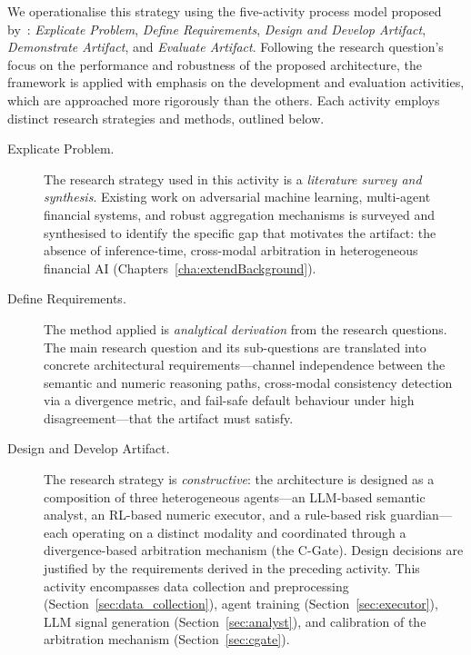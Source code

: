 We operationalise this strategy using the five-activity process model proposed
by~\cite{johannesson2014design}: \textit{Explicate Problem}, \textit{Define
Requirements}, \textit{Design and Develop Artifact}, \textit{Demonstrate
Artifact}, and \textit{Evaluate Artifact}. Following the research question's
focus on the performance and robustness of the proposed architecture, the
framework is applied with emphasis on the development and evaluation activities,
which are approached more rigorously than the others. Each activity employs
distinct research strategies and methods, outlined below.

\begin{description}
    \item[Explicate Problem.] The research strategy used in this activity is a
    \textit{literature survey and synthesis}. Existing work on adversarial
    machine learning, multi-agent financial systems, and robust aggregation
    mechanisms is surveyed and synthesised to identify the specific gap that
    motivates the artifact: the absence of inference-time, cross-modal
    arbitration in heterogeneous financial AI
    (Chapters~\ref{cha:extendBackground}).

    \item[Define Requirements.] The method applied is \textit{analytical
    derivation} from the research questions. The main research question and its
    sub-questions are translated into concrete architectural requirements---channel
    independence between the semantic and numeric reasoning paths, cross-modal
    consistency detection via a divergence metric, and fail-safe default
    behaviour under high disagreement---that the artifact must satisfy.

    \item[Design and Develop Artifact.] The research strategy is
    \textit{constructive}: the architecture is designed as a composition of three
    heterogeneous agents---an LLM-based semantic analyst, an RL-based numeric
    executor, and a rule-based risk guardian---each operating on a distinct
    modality and coordinated through a divergence-based arbitration mechanism
    (the C-Gate). Design decisions are justified by the requirements
    derived in the preceding activity. This activity encompasses data collection
    and preprocessing (Section~\ref{sec:data_collection}), agent training
    (Section~\ref{sec:executor}), LLM signal generation
    (Section~\ref{sec:analyst}), and calibration of the arbitration mechanism
    (Section~\ref{sec:cgate}).


\end{description}
